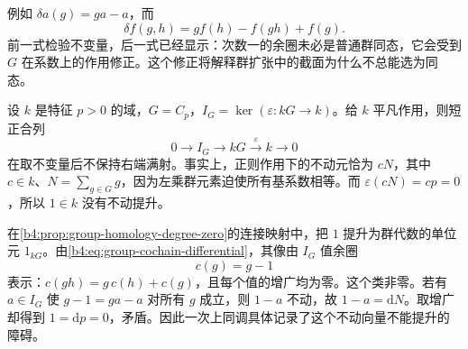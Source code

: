 例如 \(\delta a(g)=ga-a\)，而
\[
\delta f(g,h)=g f(h)-f(gh)+f(g).
\]
前一式检验不变量，后一式已经显示：次数一的余圈未必是普通群同态，它会受到 \(G\) 在系数上的作用修正。这个修正将解释群扩张中的截面为什么不总能选为同态。

\begin{example}\label{b4:exm:modular-augmentation-obstruction}
设 \(k\) 是特征 \(p>0\) 的域，\(G=C_p\)，\(I_G=\ker(\varepsilon:kG\to k)\)。给 \(k\) 平凡作用，则短正合列
\[
0\longrightarrow I_G\longrightarrow kG\xrightarrow{\varepsilon}k\longrightarrow0
\]
在取不变量后不保持右端满射。事实上，正则作用下的不动元恰为
\(cN\)，其中 \(c\in k\)、\(N=\sum_{g\in G}g\)，因为左乘群元素迫使所有基系数相等。而 \(\varepsilon(cN)=cp=0\)，所以 \(1\in k\) 没有不动提升。

\ProseParagraphBreak
在\cref{b4:prop:group-homology-degree-zero}的连接映射中，把 \(1\) 提升为群代数的单位元 \(1_{kG}\)。由\eqref{b4:eq:group-cochain-differential}，其像由 \(I_G\) 值余圈
\[
c(g)=g-1
\]
表示：\(c(gh)=g\,c(h)+c(g)\)，且每个值的增广均为零。这个类非零。若有 \(a\in I_G\) 使 \(g-1=ga-a\) 对所有 \(g\) 成立，则 \(1-a\) 不动，故 \(1-a=\mathrm{d}N\)。取增广却得到 \(1=\mathrm{d}p=0\)，矛盾。因此一次上同调具体记录了这个不动向量不能提升的障碍。
\end{example}
